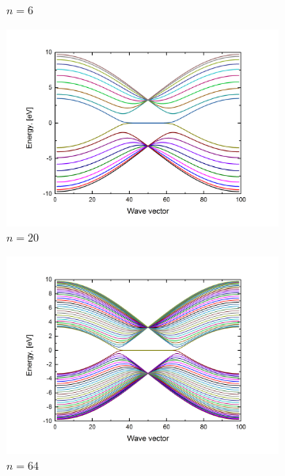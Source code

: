 \begin{figure}[hb!]
\begin{subfigure}{.5\textwidth}
  \caption{$n=6$}
  \label{fig:zz12}
\end{subfigure}
\begin{subfigure}{.5\textwidth}
  \centering
  \includegraphics[width=\linewidth]{img/zz_ribbon_20}
  \caption{$n=20$}
  \label{fig:zz6}
\end{subfigure}%
\begin{subfigure}{.5\textwidth}
  \centering
  \includegraphics[width=\linewidth]{img/zz_ribbon_64}
  \caption{$n=64$}
  \label{fig:zz64}
\end{subfigure}
\begin{subfigure}{.5\textwidth}
  \centering

\end{subfigure}
\end{figure}
